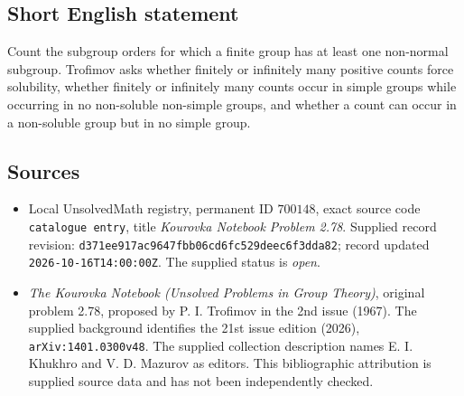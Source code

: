 \documentclass[11pt]{article}
\begin{document}
\subsection{Short English statement}
Count the subgroup orders for which a finite group has at least one non-normal subgroup. Trofimov asks whether finitely or infinitely many positive counts force solubility, whether finitely or infinitely many counts occur in simple groups while occurring in no non-soluble non-simple groups, and whether a count can occur in a non-soluble group but in no simple group.
\subsection{Sources}
\begin{itemize}
\item Local UnsolvedMath registry, permanent ID \(700148\), exact source code \texttt{catalogue entry}, title \emph{Kourovka Notebook Problem 2.78}. Supplied record revision: \texttt{d371ee917ac9647fbb06cd6fc529deec6f3dda82}; record updated \texttt{2026-10-16T14:00:00Z}. The supplied status is \emph{open}.
\item \emph{The Kourovka Notebook (Unsolved Problems in Group Theory)}, original problem 2.78, proposed by P. I. Trofimov in the 2nd issue (1967). The supplied background identifies the 21st issue edition (2026), \texttt{arXiv:1401.0300v48}. The supplied collection description names E. I. Khukhro and V. D. Mazurov as editors. This bibliographic attribution is supplied source data and has not been independently checked.
\end{itemize}
\end{document}
